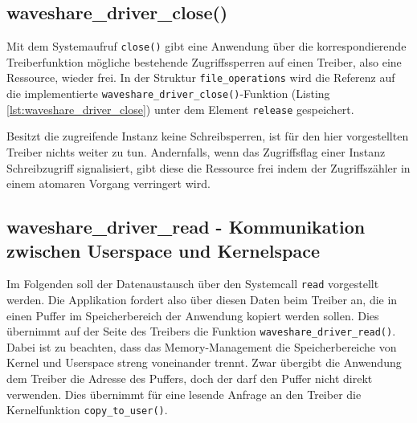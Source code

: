 \subsection{waveshare\_driver\_close()}
Mit dem Systemaufruf \texttt{close()} gibt eine Anwendung über die korrespondierende Treiberfunktion mögliche bestehende Zugriffssperren auf einen Treiber, also eine Ressource, wieder frei. In der Struktur \texttt{file\_operations} wird die Referenz auf die implementierte \texttt{waveshare_driver_close()}-Funktion (Listing \ref{lst:waveshare_driver_close}) unter dem Element \texttt{release} gespeichert. 

Besitzt die zugreifende Instanz keine Schreibsperren, ist für den hier vorgestellten Treiber nichts weiter zu tun. Andernfalls, wenn das Zugriffsflag einer Instanz Schreibzugriff signalisiert, gibt diese die Ressource frei indem der Zugriffszähler in einem atomaren Vorgang verringert wird. 




\subsection{waveshare\_driver\_read - Kommunikation zwischen Userspace und Kernelspace} %
Im Folgenden soll der Datenaustausch über den Systemcall \texttt{read} vorgestellt werden. Die Applikation fordert also über diesen Daten beim Treiber an, die in einen Puffer im Speicherbereich der Anwendung kopiert werden sollen. Dies übernimmt auf der Seite des Treibers die Funktion \texttt{waveshare_driver_read()}. Dabei ist zu beachten, dass das Memory-Management die Speicherbereiche von Kernel und Userspace streng voneinander trennt. Zwar übergibt die Anwendung dem Treiber die Adresse des Puffers, doch der darf den Puffer nicht direkt verwenden. Dies übernimmt für eine lesende Anfrage an den Treiber die Kernelfunktion \texttt{copy_to_user()}. 

